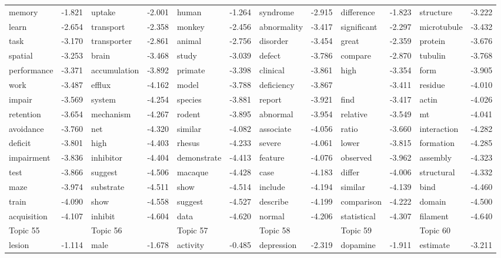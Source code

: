\documentclass{article}
\begin{document}
\begin{table}
{\begin{tabular}{|l r|l r|l r|l r|l r|l r|}
\hline
memory & -1.821 & uptake & -2.001 & human & -1.264 & syndrome & -2.915 & difference & -1.823 & structure & -3.222\\
learn & -2.654 & transport & -2.358 & monkey & -2.456 & abnormality & -3.417 & significant & -2.297 & microtubule & -3.432\\
task & -3.170 & transporter & -2.861 & animal & -2.756 & disorder & -3.454 & great & -2.359 & protein & -3.676\\
spatial & -3.253 & brain & -3.468 & study & -3.039 & defect & -3.786 & compare & -2.870 & tubulin & -3.768\\
performance & -3.371 & accumulation & -3.892 & primate & -3.398 & clinical & -3.861 & high & -3.354 & form & -3.905\\
work & -3.487 & efflux & -4.162 & model & -3.788 & deficiency & -3.867 &  & -3.411 & residue & -4.010\\
impair & -3.569 & system & -4.254 & species & -3.881 & report & -3.921 & find & -3.417 & actin & -4.026\\
retention & -3.654 & mechanism & -4.267 & rodent & -3.895 & abnormal & -3.954 & relative & -3.549 & mt & -4.041\\
avoidance & -3.760 & net & -4.320 & similar & -4.082 & associate & -4.056 & ratio & -3.660 & interaction & -4.282\\
deficit & -3.801 & high & -4.403 & rhesus & -4.233 & severe & -4.061 & lower & -3.815 & formation & -4.285\\
impairment & -3.836 & inhibitor & -4.404 & demonstrate & -4.413 & feature & -4.076 & observed & -3.962 & assembly & -4.323\\
test & -3.866 & suggest & -4.506 & macaque & -4.428 & case & -4.183 & differ & -4.006 & structural & -4.332\\
maze & -3.974 & substrate & -4.511 & show & -4.514 & include & -4.194 & similar & -4.139 & bind & -4.460\\
train & -4.090 & show & -4.558 & suggest & -4.527 & describe & -4.199 & comparison & -4.222 & domain & -4.500\\
acquisition & -4.107 & inhibit & -4.604 & data & -4.620 & normal & -4.206 & statistical & -4.307 & filament & -4.640\\
\hline
\hline
Topic 55 & &Topic 56 & &Topic 57 & &Topic 58 & &Topic 59 & &Topic 60 &\\
\hline
lesion & -1.114 & male & -1.678 & activity & -0.485 & depression & -2.319 & dopamine & -1.911 & estimate & -3.211\\

\end{tabular}}
\end{table}
\end{document}

